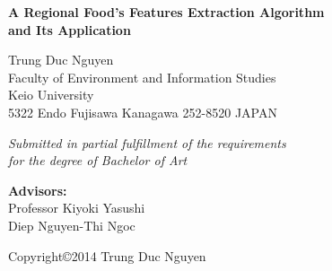 \documentclass[12pt,a4j]{report}
\begin{document}
\thispagestyle{empty}
\parindent=1pt

\begin{center}

\vspace{30mm}

{\Large\bf A Regional Food's Features Extraction Algorithm}\\ 
{\Large\bf and Its Application}\\
\vspace{3mm}

\vspace{10mm}

{\LARGE Trung Duc Nguyen }\\
\vspace{10mm}
{\Large Faculty of Environment and Information Studies}\\
\vspace{5mm}
{\LARGE Keio University}\\
\vspace{5mm}
{\Large 5322 Endo Fujisawa Kanagawa 252-8520}
{\Large JAPAN}\\
\vspace{10mm}

{\Large\it  Submitted in partial fulfillment of the requirements} \\
\vspace{3mm}
{\Large\it  for the degree of Bachelor of Art}\\

\vspace{12mm}

\textbf{{\Large Advisors:}}\\
\vspace{5mm}
{\Large Professor Kiyoki Yasushi}\\
\vspace{2mm}
{\Large Diep Nguyen-Thi Ngoc}\\
\vspace{2mm}


\vspace{12mm}

{\large Copyright\copyright  2014 Trung Duc Nguyen}

\end{center}
\end{document}
